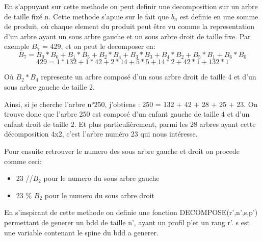 \documentclass[french]{article}
\begin{document}
En s'appuyant sur cette methode on peut definir une decomposition sur un arbre de taille fixé n. Cette methode s'apuie sur le fait que \(b_n\) est definie en une somme de produit, où chaque element du produit peut être vu comme la representation d'un arbre ayant un sous arbre gauche et un sous arbre droit de taille fixe. Par exemple \(B_7\) = 429, et on peut le decomposer en:
\[B_7=B_0*B_6+B_1*B_5+B_2*B_4+B_3*B_3+B_4*B_2+B_5*B_1+B_6*B_0\]
\[429=1*132+1*42+2*14+5*5+14*2+42*1+132*1\]

Où \(B_2*B_4\) represente un arbre composé d'un sous arbre droit de taille 4 et d'un sous arbre gauche de taille 2.

Ainsi, si je cherche l'arbre n\si{\degree}250, j'obtiens : 250 = 132 + 42 + 28 + 25 + 23. On trouve donc que l'arbre 250 est composé
d'un enfant gauche de taille 4 et d'un enfant droit de taille 2. Et plus particulièrement, parmi les 28 arbres ayant cette
décomposition 4x2, c'est l'arbre numéro 23 qui nous intéresse.


Pour ensuite retrouver le numero des sous arbre gauche et droit on procede comme ceci:
\begin{itemize}
    \item 23 //\( B_2 \) pour le numero du sous arbre gauche
    \item 23 \% \(B_2\)   pour le numero du sous arbre droit
\end{itemize}

En s'inspirant de cette methode on definie une fonction DECOMPOSE(r\textquoteright,n\textquoteright,s,p\textquoteright) permettant de generer un bdd de taille n\textquoteright, ayant un profil p\textquoteright et un rang r\textquoteright. s est une variable contenant le spine du bdd a generer.
\end{document}
